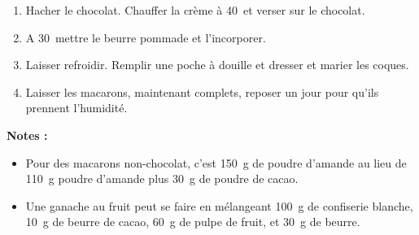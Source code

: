 
\begin{ingredients}
\end{ingredients}


\begin{recipe}
  \begin{enumerate}

  \item Hacher le chocolat.  Chauffer la cr\`eme \`a 40\degreeC\ et verser
    sur le chocolat.

  \item A 30\degreeC\ mettre le beurre pommade et l'incorporer.

  \item Laisser refroidir.  Remplir une poche \`a douille et dresser
    et marier les coques.

  \item Laisser les macarons, maintenant complets, reposer un jour pour
    qu'ils prennent l'humidit\'e.

  \end{enumerate}
\end{recipe}

\textbf{Notes :}
\begin{itemize}
\item Pour des macarons non-chocolat, c'est 150~g de poudre d'amande
  au lieu de 110~g poudre d'amande plus 30~g de poudre de cacao.
\item Une ganache au fruit peut se faire en m\'elangeant 100~g de
  confiserie blanche, 10~g de beurre de cacao, 60~g de pulpe de fruit,
  et 30~g de beurre.
\end{itemize}
